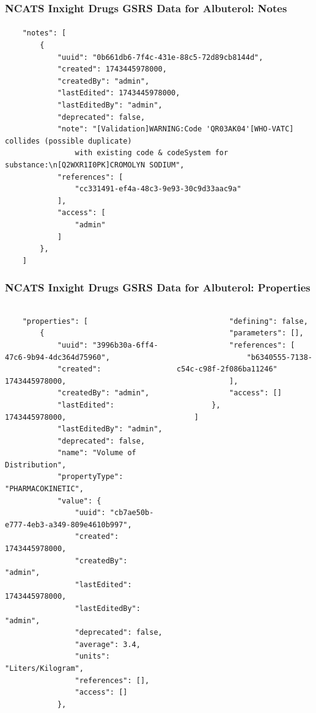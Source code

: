 \documentclass[aspectratio=169,xcolor=dvipsnames]{beamer}
\begin{document}
\begin{frame}[fragile,t]
  \frametitle{NCATS Inxight Drugs GSRS Data for Albuterol: Notes}
  \framesubtitle{}
  \tiny
\begin{verbatim}
    "notes": [
        {
            "uuid": "0b661db6-7f4c-431e-88c5-72d89cb8144d",
            "created": 1743445978000,
            "createdBy": "admin",
            "lastEdited": 1743445978000,
            "lastEditedBy": "admin",
            "deprecated": false,
            "note": "[Validation]WARNING:Code 'QR03AK04'[WHO-VATC] collides (possible duplicate)
                with existing code & codeSystem for substance:\n[Q2WXR1I0PK]CROMOLYN SODIUM",
            "references": [
                "cc331491-ef4a-48c3-9e93-30c9d33aac9a"
            ],
            "access": [
                "admin"
            ]
        },
    ]
\end{verbatim}
\end{frame}

\begin{frame}[fragile,t]
  \frametitle{NCATS Inxight Drugs GSRS Data for Albuterol: Properties}
  \framesubtitle{}
  \tiny
  \begin{columns}[t]
    \begin{column}{0.5\textwidth}
\begin{verbatim}
    "properties": [
        {
            "uuid": "3996b30a-6ff4-47c6-9b94-4dc364d75960",
            "created": 1743445978000,
            "createdBy": "admin",
            "lastEdited": 1743445978000,
            "lastEditedBy": "admin",
            "deprecated": false,
            "name": "Volume of Distribution",
            "propertyType": "PHARMACOKINETIC",
            "value": {
                "uuid": "cb7ae50b-e777-4eb3-a349-809e4610b997",
                "created": 1743445978000,
                "createdBy": "admin",
                "lastEdited": 1743445978000,
                "lastEditedBy": "admin",
                "deprecated": false,
                "average": 3.4,
                "units": "Liters/Kilogram",
                "references": [],
                "access": []
            },
\end{verbatim}
    \end{column}
    \begin{column}{0.5\textwidth}
\begin{verbatim}
            "defining": false,
            "parameters": [],
            "references": [
                "b6340555-7138-c54c-c98f-2f086ba11246"
            ],
            "access": []
        },
    ]
\end{verbatim}
    \end{column}
  \end{columns}
\end{frame}
\end{document}
